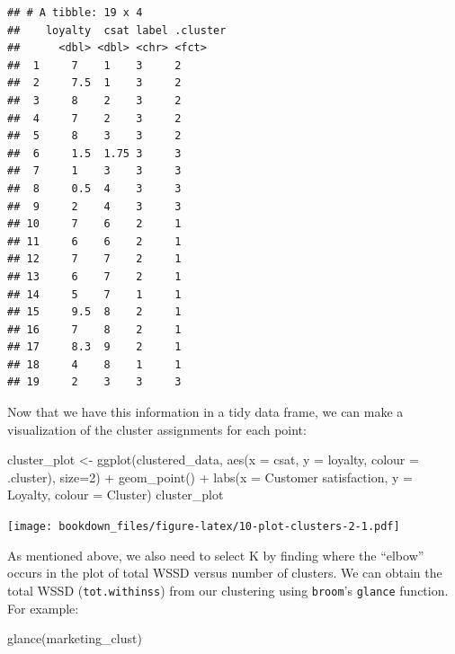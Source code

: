\documentclass[
]{krantz}
\makeatletter
\newenvironment{Shaded}{\begin{snugshade}}{\end{snugshade}}
\newcommand{\AttributeTok}[1]{\textcolor[rgb]{0.61,0.61,0.61}{#1}}
\newcommand{\DecValTok}[1]{\textcolor[rgb]{0.06,0.06,0.06}{#1}}
\newcommand{\FunctionTok}[1]{\textcolor[rgb]{0,0,0}{#1}}
\newcommand{\NormalTok}[1]{#1}
\newcommand{\OtherTok}[1]{\textcolor[rgb]{0.37,0.37,0.37}{#1}}
\newcommand{\SpecialCharTok}[1]{\textcolor[rgb]{0,0,0}{#1}}
\newcommand{\StringTok}[1]{\textcolor[rgb]{0.5,0.5,0.5}{#1}}
\newenvironment{kframe}{%
\medskip{}
\setlength{\fboxsep}{.8em}
 \def\at@end@of@kframe{}%
 \ifinner\ifhmode%
  \def\at@end@of@kframe{\end{minipage}}%
  \begin{minipage}{\columnwidth}%
 \fi\fi%
 \def\FrameCommand##1{\hskip\@totalleftmargin \hskip-\fboxsep
 \colorbox{shadecolor}{##1}\hskip-\fboxsep
     \hskip-\linewidth \hskip-\@totalleftmargin \hskip\columnwidth}%
 \MakeFramed {\advance\hsize-\width
   \@totalleftmargin\z@ \linewidth\hsize
   \@setminipage}}%
 {\par\unskip\endMakeFramed%
 \at@end@of@kframe}
\renewenvironment{Shaded}{\begin{kframe}}{\end{kframe}}
\makeatother
\begin{document}
\begin{verbatim}
## # A tibble: 19 x 4
##    loyalty  csat label .cluster
##      <dbl> <dbl> <chr> <fct>   
##  1     7    1    3     2       
##  2     7.5  1    3     2       
##  3     8    2    3     2       
##  4     7    2    3     2       
##  5     8    3    3     2       
##  6     1.5  1.75 3     3       
##  7     1    3    3     3       
##  8     0.5  4    3     3       
##  9     2    4    3     3       
## 10     7    6    2     1       
## 11     6    6    2     1       
## 12     7    7    2     1       
## 13     6    7    2     1       
## 14     5    7    1     1       
## 15     9.5  8    2     1       
## 16     7    8    2     1       
## 17     8.3  9    2     1       
## 18     4    8    1     1       
## 19     2    3    3     3
\end{verbatim}

Now that we have this information in a tidy data frame, we can make a visualization
of the cluster assignments for each point:

\begin{Shaded}
\begin{Highlighting}[]
\NormalTok{cluster\_plot }\OtherTok{\textless{}{-}} \FunctionTok{ggplot}\NormalTok{(clustered\_data, }
                       \FunctionTok{aes}\NormalTok{(}\AttributeTok{x =}\NormalTok{ csat, }\AttributeTok{y =}\NormalTok{ loyalty, }\AttributeTok{colour =}\NormalTok{ .cluster), }
                       \AttributeTok{size=}\DecValTok{2}\NormalTok{) }\SpecialCharTok{+}
  \FunctionTok{geom\_point}\NormalTok{() }\SpecialCharTok{+}
  \FunctionTok{labs}\NormalTok{(}\AttributeTok{x =} \StringTok{\textquotesingle{}Customer satisfaction\textquotesingle{}}\NormalTok{, }\AttributeTok{y =} \StringTok{\textquotesingle{}Loyalty\textquotesingle{}}\NormalTok{, }\AttributeTok{colour =} \StringTok{\textquotesingle{}Cluster\textquotesingle{}}\NormalTok{)}
\NormalTok{cluster\_plot}
\end{Highlighting}
\end{Shaded}

\texttt{[image: bookdown\_files/figure-latex/10-plot-clusters-2-1.pdf]}

As mentioned above, we also need to select K by finding
where the ``elbow'' occurs in the plot of total WSSD versus number of clusters.
We can obtain the total WSSD (\texttt{tot.withinss}) from our
clustering using \texttt{broom}'s \texttt{glance} function. For example:

\begin{Shaded}
\begin{Highlighting}[]
\FunctionTok{glance}\NormalTok{(marketing\_clust)}
\end{Highlighting}
\end{Shaded}
\end{document}
